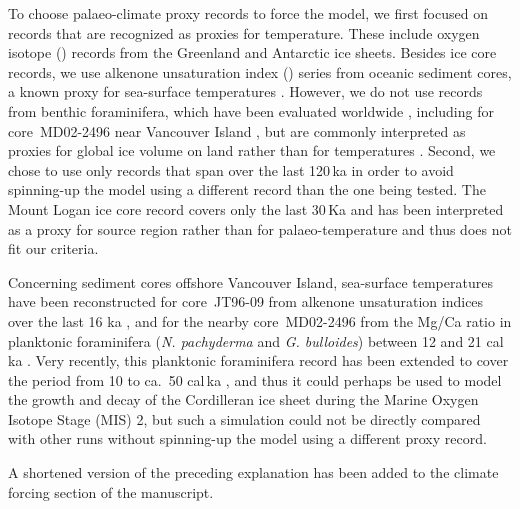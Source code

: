 To choose palaeo-climate proxy records to force the model, we first focused on
records that are recognized as proxies for temperature. These include oxygen
isotope () records from the Greenland and Antarctic ice
sheets. Besides ice core records, we use alkenone unsaturation index
() series from oceanic sediment cores, a known proxy for
sea-surface temperatures \citep{Prahl.Wakeham.1987, Prahl.etal.1988,
Muller.etal.1998}. However, we do not use  records from benthic
foraminifera, which have been evaluated worldwide \citep{Lisiecki.Raymo.2005},
including for core~MD02-2496 near Vancouver Island \citep{Cosma.etal.2008}, but
are commonly interpreted as proxies for global ice volume on land rather than
for temperatures \citep{Shackleton.1967}. Second, we chose to use only records
that span over the last 120\,ka in order to avoid spinning-up the model using a
different record than the one being tested. The Mount Logan ice core
 record covers only the last 30\,Ka and has been interpreted
as a proxy for source region rather than for palaeo-temperature
\citep{Fisher.etal.2004, Fisher.etal.2008} and thus does not fit our criteria.

Concerning sediment cores offshore Vancouver Island, sea-surface temperatures
have been reconstructed for core~JT96-09 from alkenone unsaturation indices
over the last 16 ka \citep{Kienast.McKay.2001}, and for the nearby
core~MD02-2496 from the Mg/Ca ratio in planktonic foraminifera (\emph{N.
pachyderma} and \emph{G. bulloides}) between 12 and
21\,\,cal\,ka \citep{Taylor.etal.2014}. Very recently, this
planktonic foraminifera record has been extended to cover the period from 10 to
ca.~50\,\,cal\,ka \citep{Taylor.etal.2015}, and thus it
could perhaps be used to model the growth and decay of the Cordilleran ice
sheet during
the Marine Oxygen Isotope Stage (MIS) 2, but such a simulation could not be
directly compared with other runs without spinning-up the model using a
different proxy record.

A shortened version of the preceding explanation has been added to the climate
forcing section of the manuscript.


